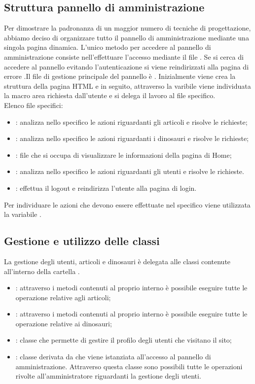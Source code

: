 \documentclass[12pt]{article}
\begin{document}
	\subsection{Struttura pannello di amministrazione}
	Per dimostrare la padronanza di un maggior numero di tecniche di progettazione, abbiamo deciso di organizzare tutto il pannello di amministrazione mediante una singola pagina dinamica. L'unico metodo per accedere al pannello di amministrazione consiste nell'effettuare l'accesso mediante il file . Se si cerca di accedere al pannello evitando l'autenticazione si viene reindirizzati alla pagina di errore  .Il file di gestione principale del pannello è . Inizialmente viene crea la struttura della pagina HTML e in seguito, attraverso la varibile   viene individuata la macro area richiesta dall'utente e si delega il lavoro al file specifico.\\
	Elenco file specifici:
	\begin{itemize}
		\item {}: analizza nello specifico le azioni riguardanti gli articoli e risolve le richieste;
		\item {}: analizza nello specifico le azioni riguardanti i dinosauri e risolve le richieste;
		\item {}: file che si occupa di visualizzare le informazioni della pagina di Home;
		\item {}: analizza nello specifico le azioni riguardanti gli utenti e risolve le richieste.
		\item {}: effettua il logout e reindirizza l'utente alla pagina di login.
	\end{itemize}
	Per individuare le azioni che devono essere effettuate nel specifico viene utilizzata la variabile .
	
	\subsection{Gestione e utilizzo delle classi}
	 La gestione degli utenti, articoli e dinosauri è delegata alle classi contenute all'interno della cartella .
	 \begin{itemize}
	 	\item {}: attraverso i metodi contenuti al proprio interno è possibile eseguire tutte le operazione relative agli articoli;
	 	\item {}: attraverso i metodi contenuti al proprio interno è possibile eseguire tutte le operazione relative ai dinosauri;
	 	\item {}: classe che permette di gestire il profilo degli utenti che visitano il sito;
	 	\item {}: classe derivata da  che viene istanziata all'accesso al pannello di amministrazione. Attraverso questa classe sono possibili tutte le operazioni rivolte all'amministratore riguardanti la gestione degli utenti.
 	 \end{itemize}
\end{document}
